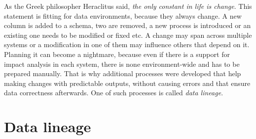 \par
As the Greek philosopher Heraclitus said, \textit{the only constant in life is change}. This statement is fitting for data environments, because they always change. A new column is added to a schema, two are removed, a new process is introduced or an existing one needs to be modified or fixed etc. A change may span across multiple systems or a modification in one of them may influence others that depend on it. Planning it can become a nightmare, because even if there is a support for impact analysis in each system, there is none environment-wide and has to be prepared manually. That is why additional processes were developed that help making changes with predictable outputs, without causing errors and that ensure data correctness afterwards. One of such processes is called \textit{data lineage}. 

\section{Data lineage}

